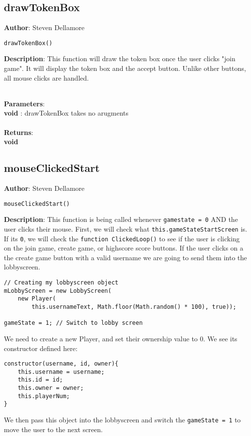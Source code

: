 \documentclass[12pt]{article}
\begin{document}
\subsection{drawTokenBox}
\textbf{Author}: Steven Dellamore 
\vspace*{1\baselineskip}
\begin{lstlisting}
drawTokenBox()
\end{lstlisting} 
\vspace*{1\baselineskip}
\textbf{Description}: This function will draw the token box once the user clicks "join game". It will display the token box and the accept button. Unlike other buttons, all mouse clicks are handled. 


\textbf{\large{\\Parameters}}:\\
\textbf{void }: drawTokenBox takes no arugments\\\textbf{\large{\\Returns}}:\\\textbf{void}

\subsection{mouseClickedStart}
\textbf{Author}: Steven Dellamore 
\vspace*{1\baselineskip}
\begin{lstlisting}
mouseClickedStart()
\end{lstlisting} 
\vspace*{1\baselineskip}
\textbf{Description}: This function is being called whenever \texttt{gamestate = 0} AND the user clicks their mouse. First, we will check what \texttt{this.gameStateStartScreen} is. If its \texttt{0}, we will check the \texttt{function ClickedLoop()} to see if the user is clicking on the join game, create game, or highscore score buttons. If the user clicks on a the create game button with a valid username we are going to send them into the lobbyscreen. 
\begin{verbatim}
// Creating my lobbyscreen object
mLobbyScreen = new LobbyScreen(
	new Player(
		this.usernameText, Math.floor(Math.random() * 100), true));

gameState = 1; // Switch to lobby screen
\end{verbatim}
 We need to create a new Player, and set their ownership value to 0. We see its constructor defined here: 
\begin{verbatim}
constructor(username, id, owner){
    this.username = username;
    this.id = id;
    this.owner = owner;
    this.playerNum;
}
\end{verbatim}
 We then pass this object into the lobbyscreen and switch the \texttt{gameState = 1} to move the user to the next screen. 
\end{document}

